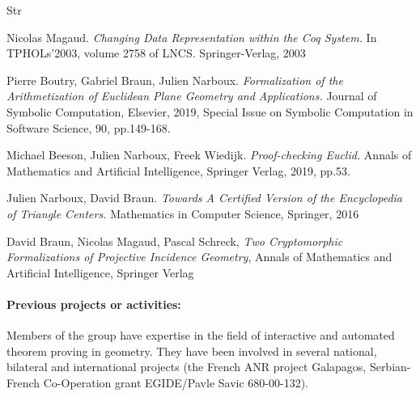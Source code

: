 \begin{sitedescription}{Str}
\begin{compactitem}
\item Nicolas Magaud. \emph{Changing Data Representation within the Coq System.} In TPHOLs'2003, volume 2758 of LNCS. Springer-Verlag, 2003
\item Pierre Boutry, Gabriel Braun, Julien Narboux. \emph{Formalization of the Arithmetization of Euclidean Plane Geometry and Applications.} Journal of Symbolic Computation, Elsevier, 2019, Special Issue on Symbolic Computation in Software Science, 90, pp.149-168.
\item Michael Beeson, Julien Narboux, Freek Wiedijk. \emph{Proof-checking Euclid.} Annals of Mathematics and Artificial Intelligence, Springer Verlag, 2019, pp.53.
\item Julien Narboux, David Braun. \emph{Towards A Certified Version of the Encyclopedia of Triangle Centers.} Mathematics in Computer Science, Springer, 2016
\item David Braun, Nicolas Magaud, Pascal Schreck, \emph{Two Cryptomorphic Formalizations of Projective Incidence Geometry}, Annals of Mathematics and Artificial Intelligence, Springer Verlag
\end{compactitem}

\paragraph{Previous projects or activities:}


Members of the group have expertise in the field of interactive and automated theorem proving in geometry.
They have been involved in several national, bilateral and international projects (the French ANR project Galapagos, Serbian-French  Co-Operation grant EGIDE/Pavle Savic 680-00-132).




\end{sitedescription}
